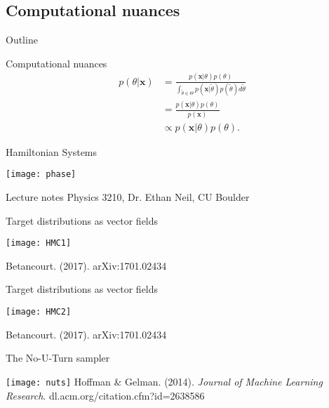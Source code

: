 \documentclass[xcolor=dvipsnames]{beamer}
\begin{document}
\subsection{Computational nuances}
\begin{frame}{Outline}
\vspace{-10.5pt}
\tableofcontents[currentsection,subsectionstyle=show/shaded/hide]
\end{frame}

\begin{frame}{Computational nuances}
\begin{align*}
p(\theta|\textbf{x})&=\frac{p(\textbf{x}|\theta)p(\theta)}{\int_{\tilde{\theta} \in \Theta} p(\textbf{x}|\tilde{\theta})p(\tilde{\theta})d\tilde{\theta}}\\ &=\frac{p(\textbf{x}|\theta)p(\theta)}{p(\textbf{x})}\\
&\propto p(\textbf{x}|\theta)p(\theta).
\end{align*}
\end{frame}

\begin{frame}{Hamiltonian Systems}
\vspace{-5pt}
\begin{center}
\texttt{[image: phase]}

Lecture notes Physics 3210, Dr. Ethan Neil, CU Boulder
\end{center}
\end{frame}

\begin{frame}{Target distributions as vector fields}
\vspace{-5pt}
\begin{center}
\texttt{[image: HMC1]}

Betancourt. (2017). arXiv:1701.02434
\end{center}
\end{frame}

\begin{frame}{Target distributions as vector fields}
\vspace{-5pt}
\begin{center}
\texttt{[image: HMC2]}

Betancourt. (2017). arXiv:1701.02434
\end{center}
\end{frame}

\begin{frame}{The No-U-Turn sampler}
\vspace{-10pt}
\begin{center}
\texttt{[image: nuts]}
\vspace{2ex}
Hoffman \& Gelman. (2014). \emph{Journal of Machine Learning Research}. dl.acm.org/citation.cfm?id=2638586
\end{center}
\end{frame}
\end{document}
